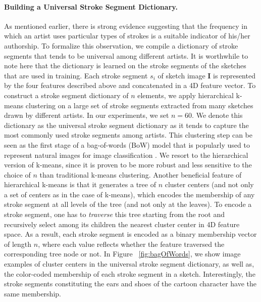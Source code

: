 \paragraph{Building a Universal Stroke Segment Dictionary.} As mentioned earlier, there is strong evidence suggesting that the frequency in which an artist uses particular types of strokes is a suitable indicator of his/her authorship. To formalize this observation, we compile a dictionary of stroke segments that tends to be universal among different artists. It is worthwhile to note here that the dictionary is learned on the stroke segments of the sketches that are used in training. Each stroke segment $s_i$ of sketch image $\mathbf{I}$ is represented by the four features described above and concatenated in a 4D feature vector. To construct a stroke segment dictionary of $n$ elements, we apply hierarchical k-means clustering on a large set of stroke segments extracted from many sketches drawn by different artists. In our experiments, we set $n=60$. We denote this dictionary as the universal stroke segment dictionary as it tends to capture the most commonly used stroke segments among artists. This clustering step can be seen as the first stage of a bag-of-words (BoW) model that is popularly used to represent natural images for image classification \cite{Sivic03}. We resort to the hierarchical version of k-means, since it is proven to be more robust and less sensitive to the choice of $n$ than traditional k-means clustering. Another beneficial feature of hierarchical k-means is that it generates a tree of $n$ cluster centers (and not only a set of centers as in the case of k-means), which encodes the membership of any stroke segment at all levels of the tree (and not only at the leaves). To encode a stroke segment, one has to \emph{traverse} this tree starting from the root and recursively select among its children the nearest cluster center in 4D feature space. As a result, each stroke segment is encoded as a binary membership vector of length $n$, where each value reflects whether the feature traversed the corresponding tree node or not. In Figure ~\ref{fig:bagOfWords}, we show image examples of cluster centers in the universal stroke segment dictionary, as well as, the color-coded membership of each stroke segment in a sketch. Interestingly, the stroke segments constituting the ears and shoes of the cartoon character have the same membership.



